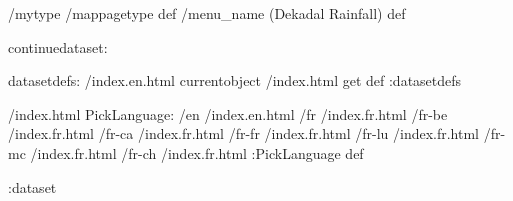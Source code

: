 \begin{ingrid}
/mytype /mappagetype def
/menu_name (Dekadal Rainfall) def

continuedataset:

datasetdefs:
/index.en.html currentobject /index.html get def
:datasetdefs

/index.html {
PickLanguage:
/en /index.en.html
/fr /index.fr.html
/fr-be /index.fr.html
/fr-ca /index.fr.html
/fr-fr /index.fr.html
/fr-lu /index.fr.html
/fr-mc /index.fr.html
/fr-ch /index.fr.html
:PickLanguage
} def

:dataset

\end{ingrid}
